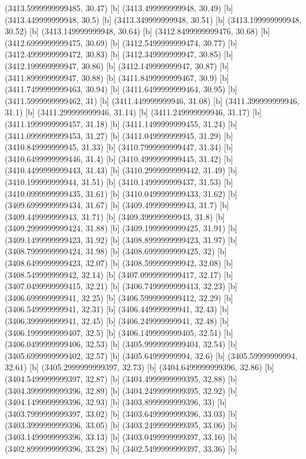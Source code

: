 {{{(3413.5999999999485, 30.47) [b] 
(3413.499999999948, 30.49) [b] 
(3413.449999999948, 30.5) [b] 
(3413.349999999948, 30.51) [b] 
(3413.199999999948, 30.52) [b] 
(3413.149999999948, 30.64) [b] 
(3412.8499999999476, 30.68) [b] 
(3412.6999999999475, 30.69) [b] 
(3412.5499999999474, 30.77) [b] 
(3412.4999999999472, 30.83) [b] 
(3412.349999999947, 30.85) [b] 
(3412.199999999947, 30.86) [b] 
(3412.149999999947, 30.87) [b] 
(3411.899999999947, 30.88) [b] 
(3411.8499999999467, 30.9) [b] 
(3411.7499999999463, 30.94) [b] 
(3411.6499999999464, 30.95) [b] 
(3411.5999999999462, 31) [b] 
(3411.449999999946, 31.08) [b] 
(3411.399999999946, 31.1) [b] 
(3411.299999999946, 31.14) [b] 
(3411.249999999946, 31.17) [b] 
(3411.1999999999457, 31.18) [b] 
(3411.1499999999455, 31.24) [b] 
(3411.0999999999453, 31.27) [b] 
(3411.049999999945, 31.29) [b] 
(3410.849999999945, 31.33) [b] 
(3410.7999999999447, 31.34) [b] 
(3410.6499999999446, 31.4) [b] 
(3410.4999999999445, 31.42) [b] 
(3410.4499999999443, 31.43) [b] 
(3410.2999999999442, 31.49) [b] 
(3410.199999999944, 31.51) [b] 
(3410.1499999999437, 31.53) [b] 
(3410.0999999999435, 31.61) [b] 
(3410.0499999999433, 31.62) [b] 
(3409.6999999999434, 31.67) [b] 
(3409.499999999943, 31.7) [b] 
(3409.449999999943, 31.71) [b] 
(3409.399999999943, 31.8) [b] 
(3409.2999999999424, 31.88) [b] 
(3409.1999999999425, 31.91) [b] 
(3409.1499999999423, 31.92) [b] 
(3408.8999999999423, 31.97) [b] 
(3408.7999999999424, 31.98) [b] 
(3408.6999999999425, 32) [b] 
(3408.6499999999423, 32.07) [b] 
(3408.599999999942, 32.08) [b] 
(3408.549999999942, 32.14) [b] 
(3407.0999999999417, 32.17) [b] 
(3407.0499999999415, 32.21) [b] 
(3406.7499999999413, 32.23) [b] 
(3406.699999999941, 32.25) [b] 
(3406.5999999999412, 32.29) [b] 
(3406.549999999941, 32.31) [b] 
(3406.449999999941, 32.43) [b] 
(3406.399999999941, 32.45) [b] 
(3406.249999999941, 32.48) [b] 
(3406.1999999999407, 32.5) [b] 
(3406.1499999999405, 32.51) [b] 
(3406.0499999999406, 32.53) [b] 
(3405.9999999999404, 32.54) [b] 
(3405.6999999999402, 32.57) [b] 
(3405.64999999994, 32.6) [b] 
(3405.59999999994, 32.61) [b] 
(3405.2999999999397, 32.73) [b] 
(3404.6499999999396, 32.86) [b] 
(3404.5499999999397, 32.87) [b] 
(3404.4999999999395, 32.88) [b] 
(3404.3999999999396, 32.89) [b] 
(3404.2499999999395, 32.92) [b] 
(3404.1499999999396, 32.93) [b] 
(3403.8999999999396, 33) [b] 
(3403.7999999999397, 33.02) [b] 
(3403.6499999999396, 33.03) [b] 
(3403.3999999999396, 33.05) [b] 
(3403.2499999999395, 33.06) [b] 
(3403.1499999999396, 33.13) [b] 
(3403.0499999999397, 33.16) [b] 
(3402.8999999999396, 33.28) [b] 
(3402.5499999999397, 33.36) [b] 
}}}

